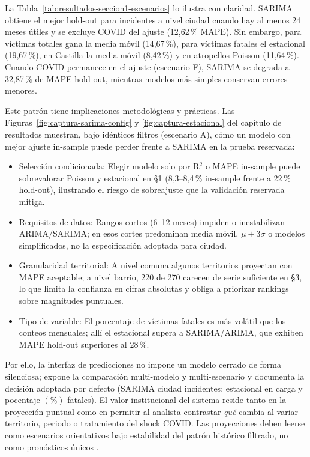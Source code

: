 La Tabla~\ref{tab:resultados-seccion1-escenarios} lo ilustra con claridad. SARIMA obtiene el mejor hold-out para incidentes a nivel ciudad cuando hay al menos 24 meses útiles y se excluye COVID del ajuste (12,62\,\% MAPE). Sin embargo, para víctimas totales gana la media móvil (14,67\,\%), para víctimas fatales el estacional (19,67\,\%), en Castilla la media móvil (8,42\,\%) y en atropellos Poisson (11,64\,\%). Cuando COVID permanece en el ajuste (escenario F), SARIMA se degrada a 32,87\,\% de MAPE hold-out, mientras modelos más simples conservan errores menores.

Este patrón tiene implicaciones metodológicas y prácticas. Las Figuras~\ref{fig:captura-sarima-config} y \ref{fig:captura-estacional} del capítulo de resultados muestran, bajo idénticos filtros (escenario A), cómo un modelo con mejor ajuste in-sample puede perder frente a SARIMA en la prueba reservada:

\begin{itemize}
	\item Selección condicionada: Elegir modelo solo por R$^2$ o MAPE in-sample puede sobrevalorar Poisson y estacional en §1 (8,3--8,4\,\% in-sample frente a 22\,\% hold-out), ilustrando el riesgo de sobreajuste que la validación reservada mitiga.
	\item Requisitos de datos: Rangos cortos (6--12 meses) impiden o inestabilizan ARIMA/SARIMA; en esos cortes predominan media móvil, $\mu \pm 3\sigma$ o modelos simplificados, no la especificación adoptada para ciudad.
	\item Granularidad territorial: A nivel comuna algunos territorios proyectan con MAPE aceptable; a nivel barrio, 220 de 270 carecen de serie suficiente en §3, lo que limita la confianza en cifras absolutas y obliga a priorizar rankings sobre magnitudes puntuales.
	\item Tipo de variable: El porcentaje de víctimas fatales es más volátil que los conteos mensuales; allí el estacional supera a SARIMA/ARIMA, que exhiben MAPE hold-out superiores al 28\,\%.
\end{itemize}

Por ello, la interfaz de predicciones no impone un modelo cerrado de forma silenciosa; expone la comparación multi-modelo y multi-escenario y documenta la decisión adoptada por defecto (SARIMA ciudad incidentes; estacional en carga y pocentaje $(\%)$ fatales). El valor institucional del sistema reside tanto en la proyección puntual como en permitir al analista contrastar \textit{qué} cambia al variar territorio, periodo o tratamiento del shock COVID. Las proyecciones deben leerse como escenarios orientativos bajo estabilidad del patrón histórico filtrado, no como pronósticos únicos \cite{oms2024}.

